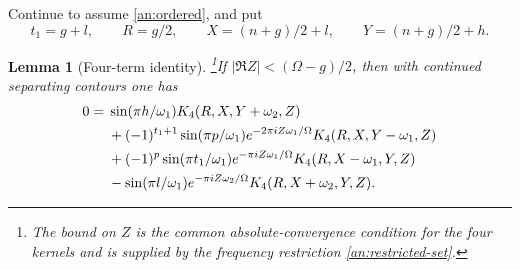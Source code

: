 \documentclass[11pt]{article}
\numberwithin{equation}{section}
\newtheorem{lemma}[theorem]{Lemma}
\theoremstyle{definition}
\theoremstyle{remark}
\begin{document}
Continue to assume \eqref{an:ordered}, and put
\[
 t_1=g+l,\qquad R=g/2,\qquad
 X=(n+g)/2+l,\qquad Y=(n+g)/2+h.
\]
\begin{lemma}[Four-term identity]\footnote{The bound on $Z$ is the common absolute-convergence condition for the four kernels and is supplied by the frequency restriction \eqref{an:restricted-set}.}\label{an:four-term}
If $|\Re Z|<(\Omega-g)/2$, then with continued separating contours
one has
\begin{align}
0={}&\sin(\pi h/\omega_1)K_4(R,X,Y+\omega_2,Z)\notag\\
 &+(-1)^{t_1+1}\sin(\pi p/\omega_1)e^{-2\pi iZ\omega_1/\Omega}
                                     K_4(R,X,Y-\omega_1,Z)\notag\\
 &+(-1)^p\sin(\pi t_1/\omega_1)e^{-\pi iZ\omega_1/\Omega}
                                     K_4(R,X-\omega_1,Y,Z)\notag\\
 &-\sin(\pi l/\omega_1)e^{-\pi iZ\omega_2/\Omega}K_4(R,X+\omega_2,Y,Z).
 \label{an:four-term-eq}
\end{align}
\end{lemma}
\end{document}
